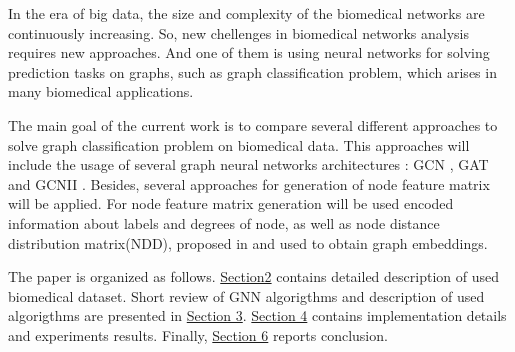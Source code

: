 In the era of big data, the size and complexity of
the biomedical networks are continuously increasing. So, new chellenges in 
biomedical networks analysis requires new approaches. And one of them is using neural networks 
for solving prediction tasks on graphs, such as graph classification problem, which arises in 
many biomedical applications.

The main goal of the current work is to compare several different approaches to solve graph classification problem 
on biomedical data.  This approaches will include the usage of 
several graph neural networks architectures : GCN \cite{GCN}, GAT\cite{GAT} and GCNII \cite{GCNII}. Besides, 
several approaches for generation of node feature matrix will be applied. For node feature matrix generation will be used
encoded information about labels and degrees of node, as well as node distance distribution matrix(NDD), proposed in \cite{Netpro2vec}
and used to obtain graph embeddings.

The paper is organized as follows. \hyperref[sec:datasets]{Section2} contains detailed description of used biomedical dataset.
Short review of GNN algorigthms and description of used algorigthms are presented in \hyperref[sec:models]{Section 3}.
\hyperref[sec:experiments]{Section 4} contains implementation details and experiments results.
 Finally, \hyperref[sec:conclusion]{Section 6} reports conclusion. 
